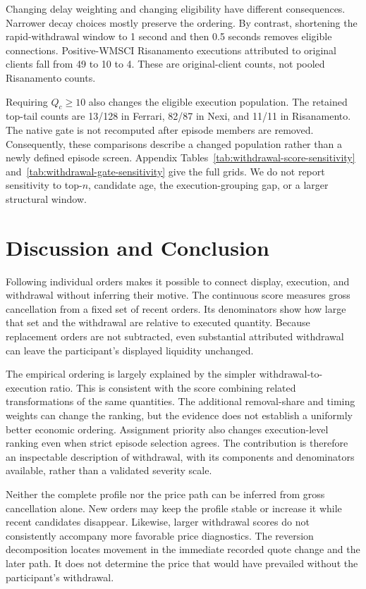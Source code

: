 \documentclass[11pt]{article}
\begin{document}
Changing delay weighting and changing eligibility have different consequences. Narrower decay choices mostly preserve the ordering. By contrast, shortening the rapid-withdrawal window to 1 second and then 0.5 seconds removes eligible connections. Positive-WMSCI Risanamento executions attributed to original clients fall from 49 to 10 to 4. These are original-client counts, not pooled Risanamento counts.

Requiring $Q_c\geq 10$ also changes the eligible execution population. The retained top-tail counts are 13/128 in Ferrari, 82/87 in Nexi, and 11/11 in Risanamento. The native gate is not recomputed after episode members are removed. Consequently, these comparisons describe a changed population rather than a newly defined episode screen. Appendix Tables~\ref{tab:withdrawal-score-sensitivity} and~\ref{tab:withdrawal-gate-sensitivity} give the full grids. We do not report sensitivity to top-$n$, candidate age, the execution-grouping gap, or a larger structural window.
\FloatBarrier

\section{Discussion and Conclusion}
\label{sec:discussion_conclusion}

Following individual orders makes it possible to connect display, execution, and withdrawal without inferring their motive. The continuous score measures gross cancellation from a fixed set of recent orders. Its denominators show how large that set and the withdrawal are relative to executed quantity. Because replacement orders are not subtracted, even substantial attributed withdrawal can leave the participant's displayed liquidity unchanged.

The empirical ordering is largely explained by the simpler withdrawal-to-execution ratio. This is consistent with the score combining related transformations of the same quantities. The additional removal-share and timing weights can change the ranking, but the evidence does not establish a uniformly better economic ordering. Assignment priority also changes execution-level ranking even when strict episode selection agrees. The contribution is therefore an inspectable description of withdrawal, with its components and denominators available, rather than a validated severity scale.

Neither the complete profile nor the price path can be inferred from gross cancellation alone. New orders may keep the profile stable or increase it while recent candidates disappear. Likewise, larger withdrawal scores do not consistently accompany more favorable price diagnostics. The reversion decomposition locates movement in the immediate recorded quote change and the later path. It does not determine the price that would have prevailed without the participant's withdrawal.
\end{document}
